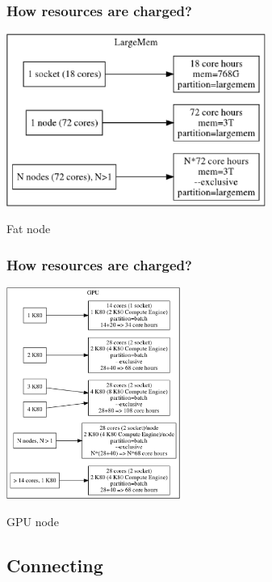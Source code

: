 \begin{frame}
	\frametitle{How resources are charged?}

        \begin{center}
		\includegraphics[width=8.5cm]{images/allokation-fatnode.eps}

                Fat node
        \end{center}

\end{frame}

\begin{frame}
	\frametitle{How resources are charged?}

        \begin{center}
		\includegraphics[width=5.7cm]{images/allokation-gpu.eps}

                GPU node
        \end{center}

\end{frame}


\subsection{Connecting}

